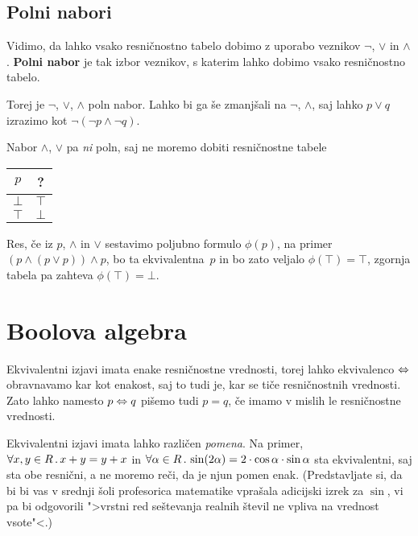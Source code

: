 \subsection{Polni nabori}
\label{sec:polni-nabori}

Vidimo, da lahko vsako resničnostno tabelo dobimo z uporabo veznikov $\neg$, $\lor$ in
$\land$. \textbf{Polni nabor} je tak izbor veznikov, s katerim lahko dobimo vsako
resničnostno tabelo.

Torej je $\neg$, $\lor$, $\land$ poln nabor. Lahko bi ga še zmanjšali na $\neg$, $\land$, saj lahko $p \lor q$ izrazimo kot $\neg (\neg p \land \neg q)$.

Nabor $\land$, $\lor$ pa \emph{ni} poln, saj ne moremo dobiti resničnostne tabele
%
\begin{center}
  \begin{tabular}{cc}
    \toprule
    $p$ & ? \\ \midrule
    $\bot$ & $\top$ \\
    $\top$ & $\bot$ \\
    \bottomrule
  \end{tabular}
\end{center}
%
Res, če iz $p$, $\land$ in $\lor$ sestavimo poljubno formulo $\phi(p)$, na primer $(p \land (p \lor p)) \land p$, bo ta ekvivalentna~$p$ in bo zato veljalo $\phi(\top) = \top$, zgornja tabela pa zahteva $\phi(\top) = \bot$.


\section{Boolova algebra}

Ekvivalentni izjavi imata enake resničnostne vrednosti, torej lahko ekvivalenco
$\Leftrightarrow$ obravnavamo kar kot enakost, saj to tudi je, kar se tiče resničnostnih
vrednosti. Zato lahko namesto $p \Leftrightarrow q$ pišemo tudi $p = q$, če imamo v mislih le
resničnostne vrednosti.

\begin{opomba}
  Ekvivalentni izjavi imata lahko različen \emph{pomena}. Na primer,
  $\forall x, y \in R \,.\, x + y = y + x$ in
  $\forall \alpha \in R \,.\, \sin(2 \alpha) = 2 \cdot \cos \alpha \cdot \sin \alpha$ sta
  ekvivalentni, saj sta obe resnični, a ne moremo reči, da je njun pomen enak. (Predstavljate si, da bi bi vas v srednji šoli profesorica matematike vprašala adicijski izrek za $\sin$, vi pa bi odgovorili ">vrstni red seštevanja realnih števil ne vpliva na vrednost vsote"<.)
\end{opomba}


